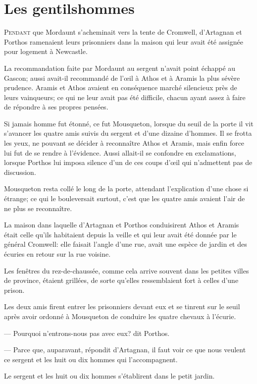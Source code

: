 \chapter{Les gentilshommes}

\lettrine{P}{endant} que Mordaunt s'acheminait vers la tente de Cromwell, d'Artagnan et Porthos ramenaient leurs prisonniers dans la maison qui leur avait été assignée pour logement à Newcastle.

La recommandation faite par Mordaunt au sergent n'avait point échappé au Gascon; aussi avait-il recommandé de l'œil à Athos et à Aramis la plus sévère prudence. Aramis et Athos avaient en conséquence marché silencieux près de leurs vainqueurs; ce qui ne leur avait pas été difficile, chacun ayant assez à faire de répondre à ses propres pensées.

Si jamais homme fut étonné, ce fut Mousqueton, lorsque du seuil de la porte il vit s'avancer les quatre amis suivis du sergent et d'une dizaine d'hommes. Il se frotta les yeux, ne pouvant se décider à reconnaître Athos et Aramis, mais enfin force lui fut de se rendre à l'évidence. Aussi allait-il se confondre en exclamations, lorsque Porthos lui imposa silence d'un de ces coups d'œil qui n'admettent pas de discussion.

Mousqueton resta collé le long de la porte, attendant l'explication d'une chose si étrange; ce qui le bouleversait surtout, c'est que les quatre amis avaient l'air de ne plus se reconnaître.

La maison dans laquelle d'Artagnan et Porthos conduisirent Athos et Aramis était celle qu'ils habitaient depuis la veille et qui leur avait été donnée par le général Cromwell: elle faisait l'angle d'une rue, avait une espèce de jardin et des écuries en retour sur la rue voisine.

Les fenêtres du rez-de-chaussée, comme cela arrive souvent dans les petites villes de province, étaient grillées, de sorte qu'elles ressemblaient fort à celles d'une prison.

Les deux amis firent entrer les prisonniers devant eux et se tinrent sur le seuil après avoir ordonné à Mousqueton de conduire les quatre chevaux à l'écurie.

— Pourquoi n'entrons-nous pas avec eux? dit Porthos.

— Parce que, auparavant, répondit d'Artagnan, il faut voir ce que nous veulent ce sergent et les huit ou dix hommes qui l'accompagnent.

Le sergent et les huit ou dix hommes s'établirent dans le petit jardin.

